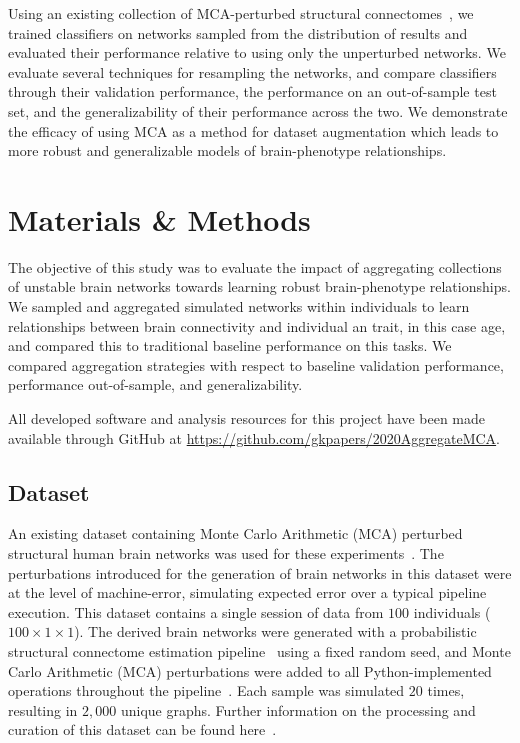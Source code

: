 \documentclass[10pt]{SelfArx} %
\begin{document}
Using an existing collection of MCA-perturbed structural connectomes~\cite{Kiar2020-yz}, we trained classifiers on
networks sampled from the distribution of results and evaluated their performance relative to using only the
unperturbed networks. We evaluate several techniques for resampling the networks, and compare classifiers through their
validation performance, the performance on an out-of-sample test set, and the generalizability of their performance
across the two. We demonstrate the efficacy of using MCA as a method for dataset augmentation which leads to more
robust and generalizable models of brain-phenotype relationships.


\section*{Materials \& Methods}

The objective of this study was to evaluate the impact of aggregating collections of unstable brain networks towards
learning robust brain-phenotype relationships. We sampled and aggregated simulated networks within individuals to learn
relationships between brain connectivity and individual an trait, in this case age, and compared this to traditional
baseline performance on this tasks. We compared aggregation strategies with respect to baseline validation performance,
performance out-of-sample, and generalizability.

All developed software and analysis resources for this project have been made available through GitHub at
\url{https://github.com/gkpapers/2020AggregateMCA}.

\subsection*{Dataset}

An existing dataset containing Monte Carlo Arithmetic (MCA) perturbed structural human brain networks was used for
these experiments~\cite{Kiar2020-yz}. The perturbations introduced for the generation of brain networks in this dataset
were at the level of machine-error, simulating expected error over a typical pipeline execution. This dataset contains
a single session of data from $100$ individuals ($100\times 1 \times1$). The derived brain networks were generated with
a probabilistic structural connectome estimation pipeline~\cite{Garyfallidis2014-ql} using a fixed random seed, and
Monte Carlo Arithmetic (MCA) perturbations were added to all Python-implemented operations throughout the
pipeline~\cite{Denis2016-wo,Parker1997-qq}. Each sample was simulated $20$ times, resulting in $2,000$ unique graphs.
Further information on the processing and curation of this dataset can be found here~\cite{Kiar2020-kz}.
\end{document}
